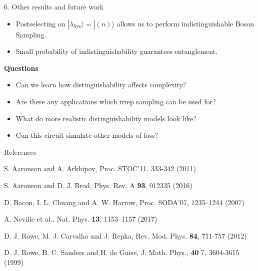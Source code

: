 \documentclass[]{templates/poster}
\begin{document}
\begin{frame}{}
\begin{columns}[t]
\begin{column}{0.422\linewidth}
  \begin{block}{\Large 6. Other results and future work}
  \begin{itemize}
  \item Postselecting on $|\lambda_{\textrm{Sys}}\rangle = |(n)\rangle$ allows us to perform indistinguishable Boson Sampling.
  \item Small probability of indistinguishability guarantees entanglement.
  \end{itemize}
  \textbf{Questions}
  \begin{itemize}
  \item Can we learn how distinguishability affects complexity?
  \item Are there any applications which irrep sampling can be used for?
  \item What do more realistic distinguishability models look like?
  \item Can this circuit simulate other models of loss?
  \end{itemize}
  \end{block}

  \begin{block}{\Large References}
  
  \noindent [AA11] S. Aaronson and A. Arkhipov, Proc. STOC'11, 333-342 (2011)
  
  \noindent [AB16] S. Aaronson and D. J. Brod, Phys. Rev. A \textbf{93}, 012335 (2016)

  
  \noindent [BCH07] D. Bacon, I. L. Chuang and A. W. Harrow, Proc. SODA'07, 1235--1244 (2007)
  
  \noindent [NSC+17] A. Neville et al., Nat. Phys. \textbf{13}, 1153–1157 (2017)
  
  \noindent [RCR12] D. J. Rowe, M. J. Carvalho and J. Repka, Rev. Mod. Phys. \textbf{84}, 711-757 (2012)
   
  \noindent [RSdG99] D. J. Rowe, B. C. Sanders and H. de Guise, J. Math. Phys., \textbf{40} 7, 3604-3615 (1999)
  \end{block}
  \end{column}
\end{columns}

\end{frame}

\end{document}
